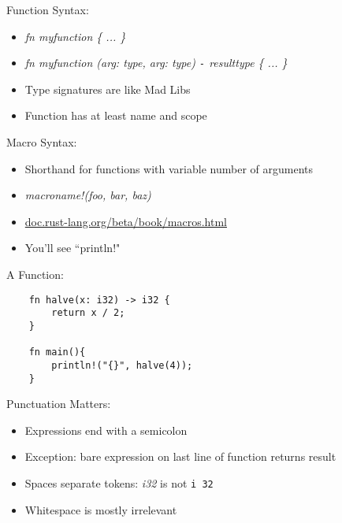 \documentclass[100pt]{beamer}
\begin{document}
\begin{frame}[fragile]
    Function Syntax:
    \begin{itemize}
        \item \textit{ fn myfunction \{ ... \} }
        \item \textit{ fn myfunction (arg: type, arg: type) \texttt{-} \textrangle{} resulttype \{ ... \} }
        \item Type signatures are like Mad Libs
        \item Function has at least name and scope
    \end{itemize}
\end{frame}

\begin{frame}[fragile]
    Macro Syntax:
    \begin{itemize}
        \item Shorthand for functions with variable number of arguments
        \item \textit{macroname!(foo, bar, baz)}
        \item \url{ doc.rust-lang.org/beta/book/macros.html }
        \item You'll see ``println!"
    \end{itemize}
\end{frame}

\begin{frame}[fragile]
    A Function:

\begin{verbatim}
    fn halve(x: i32) -> i32 {
        return x / 2;
    }

    fn main(){
        println!("{}", halve(4));
    }
\end{verbatim}

\end{frame}

\begin{frame}
    Punctuation Matters:
    \begin{itemize}
        \item Expressions end with a semicolon
        \item Exception: bare expression on last line of function returns result
        \item Spaces separate tokens: \textit{i32} is not \texttt{i  32}
        \item Whitespace is mostly irrelevant
    \end{itemize}
\end{frame}
\end{document}
